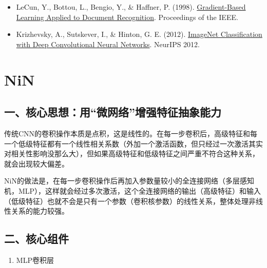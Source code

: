 \begin{itemize}
\tightlist
\item
  LeCun, Y., Bottou, L., Bengio, Y., \& Haffner, P. (1998). \href{http://yann.lecun.com/exdb/publis/pdf/lecun-98.pdf}{Gradient-Based Learning Applied to Document Recognition}. Proceedings of the IEEE.
\item
  Krizhevsky, A., Sutskever, I., \& Hinton, G. E. (2012). \href{https://papers.nips.cc/paper/4824-imagenet-classification-with-deep-convolutional-neural-networks}{ImageNet Classification with Deep Convolutional Neural Networks}. NeurIPS 2012.
\end{itemize}

\clearpage

\hypertarget{nin}{%
\section{NiN}\label{nin}}

\hypertarget{ux4e00ux6838ux5fc3ux601dux60f3ux7528ux5faeux7f51ux7edcux589eux5f3aux7279ux5f81ux62bdux8c61ux80fdux529b}{%
\subsection{一、核心思想：用``微网络''增强特征抽象能力}\label{ux4e00ux6838ux5fc3ux601dux60f3ux7528ux5faeux7f51ux7edcux589eux5f3aux7279ux5f81ux62bdux8c61ux80fdux529b}}

传统CNN的卷积操作本质是点积，这是线性的。在每一步卷积后，高级特征和每一个低级特征都有一个线性相关系数（外加一个激活函数，但只经过一次激活其实对相关性影响没那么大），但如果高级特征和低级特征之间严重不符合这种关系，就会出现较大偏差。

NiN的做法是，在每一步卷积操作后再加入参数量较小的全连接网络（多层感知机，MLP），这样就会经过多次激活，这个全连接网络的输出（高级特征）和输入（低级特征）也就不会是只有一个参数（卷积核参数）的线性关系，整体处理非线性关系的能力较强。

\hypertarget{ux4e8cux6838ux5fc3ux7ec4ux4ef6-1}{%
\subsection{二、核心组件}\label{ux4e8cux6838ux5fc3ux7ec4ux4ef6-1}}

\begin{enumerate}
\def\labelenumi{\arabic{enumi}.}
\tightlist
\item
  MLP卷积层
\end{enumerate}

